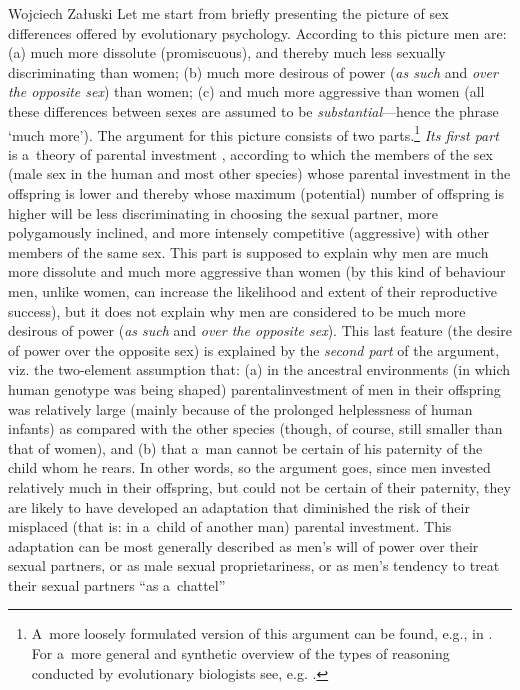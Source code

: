 \begin{artengenv}{Wojciech Załuski}
Let me start from briefly presenting the picture of sex differences offered by evolutionary psychology. According to this picture men are: (a) much more dissolute (promiscuous), and thereby much less sexually discriminating than women; (b) much more desirous of power (\textit{as such} and \textit{over the opposite sex}) than women; (c) and much more aggressive than women (all these differences between sexes are assumed to be \textit{substantial}---hence the phrase ‘much more'). The argument for this picture consists of two parts.\footnote{A~more loosely formulated version of this argument can be found, e.g., in
\parencites[][]{ridley_red_1994}[][]{crawford_psychology_1998}. %
 For a~more general and synthetic overview of the types of reasoning conducted by evolutionary biologists see, e.g. 
\parencite[][]{kozlowski_ewolucja_2018}.%
} \textit{Its first part} is a~theory of parental investment 
\parencite[cf.][]{trivers_parental_1972}, %
 according to which the members of the sex (male sex in the human and most other species) whose parental investment in the offspring is lower and thereby whose maximum (potential) number of offspring is higher will be less discriminating in choosing the sexual partner, more polygamously inclined, and more intensely competitive (aggressive) with other members of the same sex. This part is supposed to explain why men are much more dissolute and much more aggressive than women (by this kind of behaviour men, unlike women, can increase the likelihood and extent of their reproductive success), but it does not explain why men are considered to be much more desirous of power (\textit{as such} and \textit{over the opposite sex}). This last feature (the desire of power over the opposite sex) is explained by the \textit{second part} of the argument, viz. the two-element assumption that: (a) in the ancestral environments (in which human genotype was being shaped) parentalinvestment of men in their offspring was relatively large (mainly because of the prolonged helplessness of human infants) as compared with the other species (though, of course, still smaller than that of women), and (b) that a~man cannot be certain of his paternity of the child whom he rears. In other words, so the argument goes, since men invested relatively much in their offspring, but could not be certain of their paternity, they are likely to have developed an adaptation that diminished the risk of their misplaced (that is: in a~child of another man) parental investment. This adaptation can be most generally described as men's will of power over their sexual partners, or as male sexual proprietariness, or as men's tendency to treat their sexual partners ``as a~chattel'' 

\end{artengenv}
